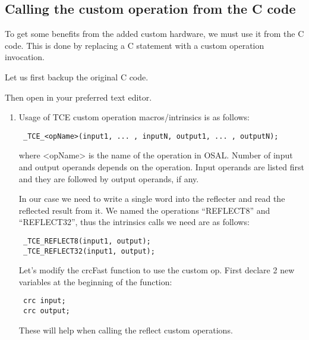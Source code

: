 \documentclass[twoside]{tceusermanual}
\begin{document}
\subsection{Calling the custom operation from the C code}

To get some benefits from the added custom hardware, we must use it
from the C code. This is done by replacing a C statement with a custom
operation invocation.

Let us first backup the original C code.


Then open  in your preferred text editor.

\begin{enumerate}
\item

Usage of TCE custom operation macros/intrinsics is as follows:

\begin{verbatim}
 _TCE_<opName>(input1, ... , inputN, output1, ... , outputN);
\end{verbatim}

where <opName> is the name of the operation in OSAL. Number of input and
output operands depends on the operation. Input operands are listed first
and they are followed by output operands, if any.

In our case we need to write a single word into the reflecter and read the
reflected result from it. We named the operations ``REFLECT8'' and ``REFLECT32'',
thus the intrinsics calls we need are as follows:

\begin{verbatim}
 _TCE_REFLECT8(input1, output);
 _TCE_REFLECT32(input1, output);
\end{verbatim}

Let's modify the crcFast function to use the custom op. First declare 2 new
variables at the beginning of the function:

\begin{verbatim}
 crc input;
 crc output;
\end{verbatim}

These will help when calling the reflect custom operations.


\end{enumerate}
\end{document}

